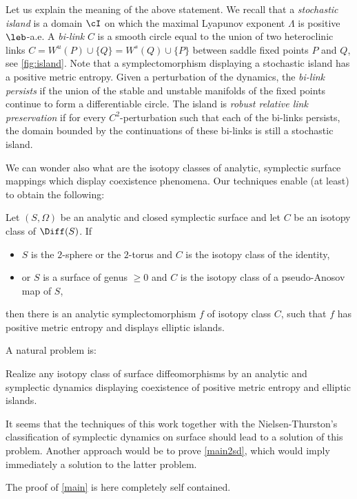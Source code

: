 Let us explain the meaning of the above statement. We recall that a \emph{stochastic island} is a domain $\cI$ on which the maximal Lyapunov exponent $\Lambda$ is positive $\leb$-a.e. A \emph{bi-link} $C$ is a smooth circle equal to the union of two heteroclinic links $C= W^u(P)\cup \{Q\}= W^s(Q)\cup \{P\}$ between saddle fixed points $P$ and $Q$, see \cref{fig:island}.
Note that a symplectomorphism displaying a stochastic island has a positive metric entropy. Given a perturbation of the dynamics, the \emph{bi-link persists} if the union of the stable and unstable manifolds of the fixed points continue to form a differentiable circle. The island is \emph{robust relative link preservation} if for every $C^2$-perturbation such that each of the bi-links persists, the domain bounded by the continuations of these bi-links is still a stochastic island.

We can wonder also what are the isotopy classes of analytic, symplectic surface mappings which display coexistence phenomena. Our techniques enable (at least) to obtain the following:
\begin{corollary}\label{coro isotopy}
Let $(S,\Omega)$ be an analytic and closed symplectic surface and let $C$ be an isotopy class of $\Diff(S)$. If
\begin{itemize}
\item $S$ is the $2$-sphere or the $2$-torus and $C$ is the isotopy class of the identity,
\item or $S$ is a surface of genus $\ge 0$ and $C$ is the isotopy class of a pseudo-Anosov map of $S$,
\end{itemize}
then there is an analytic symplectomorphism $f$ of isotopy class $C$, such that $f$ has positive metric entropy and displays elliptic islands.
\end{corollary}
A natural problem is:
\begin{problem}Realize any isotopy class of surface diffeomorphisms by an analytic and symplectic dynamics displaying coexistence of positive metric entropy and elliptic islands.
\end{problem}
 It seems that the techniques of this work together with the Nielsen-Thurston's classification of symplectic dynamics on surface should lead to a solution of this problem. Another approach would be to prove \cref{main2sd}, which would imply immediately a solution to the latter problem.

The proof of \cref{main} is here completely self contained.

